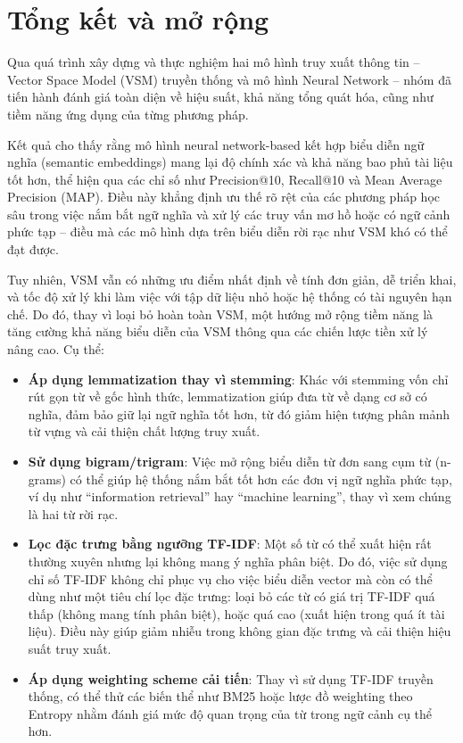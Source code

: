 \chapter{Tổng kết và mở rộng}
Qua quá trình xây dựng và thực nghiệm hai mô hình truy xuất thông tin – Vector Space Model (VSM) truyền thống và mô hình Neural Network – nhóm đã tiến hành đánh giá toàn diện về hiệu suất, khả năng tổng quát hóa, cũng như tiềm năng ứng dụng của từng phương pháp.

Kết quả cho thấy rằng mô hình neural network-based kết hợp biểu diễn ngữ nghĩa (semantic embeddings) mang lại độ chính xác và khả năng bao phủ tài liệu tốt hơn, thể hiện qua các chỉ số như Precision@10, Recall@10 và Mean Average Precision (MAP). Điều này khẳng định ưu thế rõ rệt của các phương pháp học sâu trong việc nắm bắt ngữ nghĩa và xử lý các truy vấn mơ hồ hoặc có ngữ cảnh phức tạp – điều mà các mô hình dựa trên biểu diễn rời rạc như VSM khó có thể đạt được.

Tuy nhiên, VSM vẫn có những ưu điểm nhất định về tính đơn giản, dễ triển khai, và tốc độ xử lý khi làm việc với tập dữ liệu nhỏ hoặc hệ thống có tài nguyên hạn chế. Do đó, thay vì loại bỏ hoàn toàn VSM, một hướng mở rộng tiềm năng là tăng cường khả năng biểu diễn của VSM thông qua các chiến lược tiền xử lý nâng cao. Cụ thể:

\begin{itemize}
    \item \textbf{Áp dụng lemmatization thay vì stemming}: Khác với stemming vốn chỉ rút gọn từ về gốc hình thức, lemmatization giúp đưa từ về dạng cơ sở có nghĩa, đảm bảo giữ lại ngữ nghĩa tốt hơn, từ đó giảm hiện tượng phân mảnh từ vựng và cải thiện chất lượng truy xuất.

    \item \textbf{Sử dụng bigram/trigram}: Việc mở rộng biểu diễn từ đơn sang cụm từ (n-grams) có thể giúp hệ thống nắm bắt tốt hơn các đơn vị ngữ nghĩa phức tạp, ví dụ như “information retrieval” hay “machine learning”, thay vì xem chúng là hai từ rời rạc.
    \item \textbf{Lọc đặc trưng bằng ngưỡng TF-IDF}: Một số từ có thể xuất hiện rất thường xuyên nhưng lại không mang ý nghĩa phân biệt. Do đó, việc sử dụng chỉ số TF-IDF không chỉ phục vụ cho việc biểu diễn vector mà còn có thể dùng như một tiêu chí lọc đặc trưng: loại bỏ các từ có giá trị TF-IDF quá thấp (không mang tính phân biệt), hoặc quá cao (xuất hiện trong quá ít tài liệu). Điều này giúp giảm nhiễu trong không gian đặc trưng và cải thiện hiệu suất truy xuất.
    \item \textbf{Áp dụng weighting scheme cải tiến}: Thay vì sử dụng TF-IDF truyền thống, có thể thử các biến thể như BM25 hoặc lược đồ weighting theo Entropy nhằm đánh giá mức độ quan trọng của từ trong ngữ cảnh cụ thể hơn.
\end{itemize}

